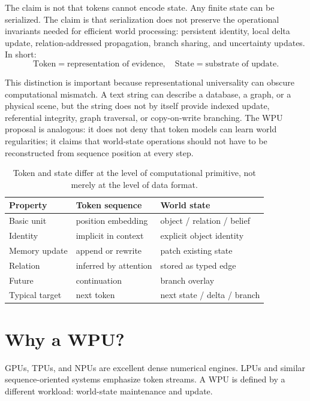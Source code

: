 \documentclass[11pt]{article}
\begin{document}
The claim is not that tokens cannot encode state. Any finite state can be
serialized. The claim is that serialization does not preserve the operational
invariants needed for efficient world processing: persistent identity, local
delta update, relation-addressed propagation, branch sharing, and uncertainty
updates. In short:
\[
\text{Token} = \text{representation of evidence}, \quad
\text{State} = \text{substrate of update}.
\]

This distinction is important because representational universality can obscure
computational mismatch. A text string can describe a database, a graph, or a
physical scene, but the string does not by itself provide indexed update,
referential integrity, graph traversal, or copy-on-write branching. The WPU
proposal is analogous: it does not deny that token models can learn world
regularities; it claims that world-state operations should not have to be
reconstructed from sequence position at every step.

\begin{table}[t]
\centering
\begin{tabular}{lll}
\toprule
Property & Token sequence & World state \\
\midrule
Basic unit & position embedding & object / relation / belief \\
Identity & implicit in context & explicit object identity \\
Memory update & append or rewrite & patch existing state \\
Relation & inferred by attention & stored as typed edge \\
Future & continuation & branch overlay \\
Typical target & next token & next state / delta / branch \\
\bottomrule
\end{tabular}
\caption{Token and state differ at the level of computational primitive, not
merely at the level of data format.}
\label{tab:token-state}
\end{table}

\section{Why a WPU?}

GPUs, TPUs, and NPUs are excellent dense numerical engines. LPUs and similar
sequence-oriented systems emphasize token streams. A WPU is defined by a
different workload: world-state maintenance and update.
\end{document}
